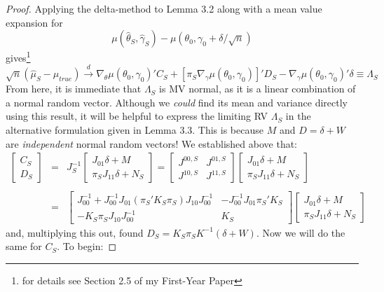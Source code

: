 \documentclass[12pt]{article}
\theoremstyle{definition}
\begin{document}
\begin{proof}
Applying the delta-method to Lemma 3.2 along with a mean value expansion for 		$$
	\mu(\hat{\theta}_S, \hat{\gamma}_S) - \mu(\theta_0, \gamma_0+\delta/\sqrt{n})
$$
gives\footnote{for details see Section 2.5 of my First-Year Paper}
	$$
		\sqrt{n}\left( \hat{\mu}_S - \mu_{true} \right) \overset{d}{\rightarrow} \nabla_{\theta}\mu(\theta_0, \gamma_0)'C_S + \left[\pi_S\nabla_\gamma \mu(\theta_0, \gamma_0)\right]'D_S - \nabla_\gamma \mu(\theta_0,\gamma_0)'\delta \equiv \Lambda_S
$$
From here, it is immediate that $\Lambda_S$ is MV normal, as it is a linear combination of a normal random vector. Although we \emph{could} find its mean and variance directly using this result, it will be helpful to express the limiting RV $\Lambda_S$ in the alternative formulation given in Lemma 3.3. This is because $M$ and $D = \delta + W$ are \emph{independent} normal random vectors! We established above that:
	\begin{eqnarray*}
		\left[\begin{array}{c}
		C_S\\
		D_S
	\end{array}\right] &=& J_S^{-1}
	\left[\begin{array}{c}
		J_{01}\delta + M\\
		\pi_S J_{11}\delta + N_S 
	\end{array}\right] = \left[\begin{array}{cc}
				J^{00,S}&J^{01,S}\\
				J^{10,S}&J^{11,S}	
		\end{array}\right] \left[\begin{array}{c}
		J_{01}\delta + M\\
		\pi_S J_{11}\delta + N_S 
	\end{array}\right] \\ \\
	&=& \left[\begin{array}{cc}
				J_{00}^{-1} + J_{00}^{-1}J_{01}\left(\pi_S'K_S\pi_S \right)J_{10}J_{00}^{-1}&-J_{00}^{-1}J_{01}\pi_S'K_S\\
				-K_S \pi_S J_{10}J_{00}^{-1}&K_S	
		\end{array}\right] \left[\begin{array}{c}
		J_{01}\delta + M\\
		\pi_S J_{11}\delta + N_S 
	\end{array}\right] 
	\end{eqnarray*}
and, multiplying this out, found $D_S = K_S \pi_S K^{-1}(\delta + W)$. Now we will do the same for $C_S$. To begin:

\end{proof}
\end{document}

